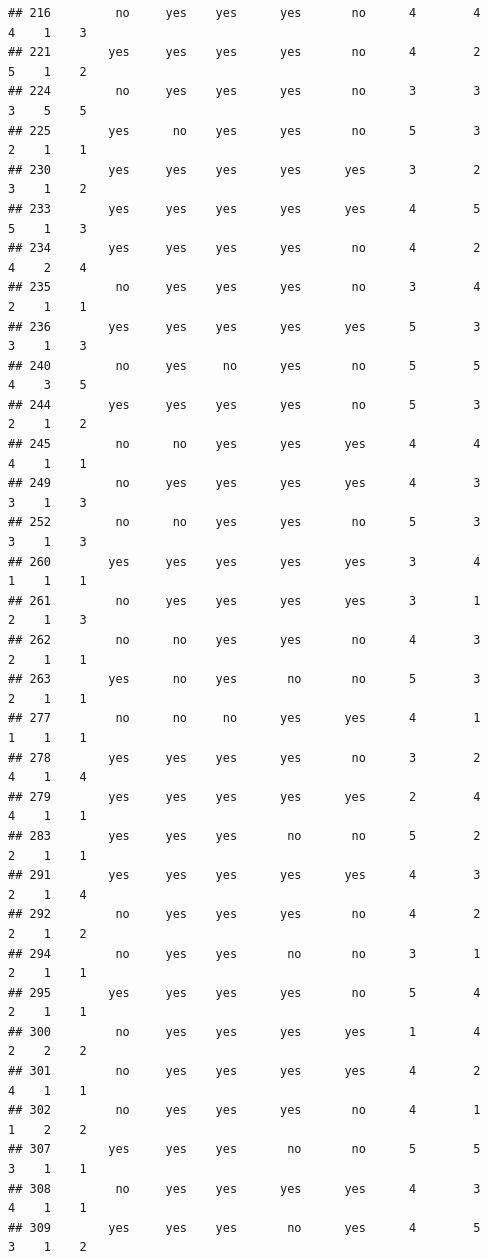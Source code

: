 \documentclass[
]{article}
\begin{document}
\begin{verbatim}
## 216         no     yes    yes      yes       no      4        4     4    1    3
## 221        yes     yes    yes      yes       no      4        2     5    1    2
## 224         no     yes    yes      yes       no      3        3     3    5    5
## 225        yes      no    yes      yes       no      5        3     2    1    1
## 230        yes     yes    yes      yes      yes      3        2     3    1    2
## 233        yes     yes    yes      yes      yes      4        5     5    1    3
## 234        yes     yes    yes      yes       no      4        2     4    2    4
## 235         no     yes    yes      yes       no      3        4     2    1    1
## 236        yes     yes    yes      yes      yes      5        3     3    1    3
## 240         no     yes     no      yes       no      5        5     4    3    5
## 244        yes     yes    yes      yes       no      5        3     2    1    2
## 245         no      no    yes      yes      yes      4        4     4    1    1
## 249         no     yes    yes      yes      yes      4        3     3    1    3
## 252         no      no    yes      yes       no      5        3     3    1    3
## 260        yes     yes    yes      yes      yes      3        4     1    1    1
## 261         no     yes    yes      yes      yes      3        1     2    1    3
## 262         no      no    yes      yes       no      4        3     2    1    1
## 263        yes      no    yes       no       no      5        3     2    1    1
## 277         no      no     no      yes      yes      4        1     1    1    1
## 278        yes     yes    yes      yes       no      3        2     4    1    4
## 279        yes     yes    yes      yes      yes      2        4     4    1    1
## 283        yes     yes    yes       no       no      5        2     2    1    1
## 291        yes     yes    yes      yes      yes      4        3     2    1    4
## 292         no     yes    yes      yes       no      4        2     2    1    2
## 294         no     yes    yes       no       no      3        1     2    1    1
## 295        yes     yes    yes      yes       no      5        4     2    1    1
## 300         no     yes    yes      yes      yes      1        4     2    2    2
## 301         no     yes    yes      yes      yes      4        2     4    1    1
## 302         no     yes    yes      yes       no      4        1     1    2    2
## 307        yes     yes    yes       no       no      5        5     3    1    1
## 308         no     yes    yes      yes      yes      4        3     4    1    1
## 309        yes     yes    yes       no      yes      4        5     3    1    2

\end{verbatim}
\end{document}

